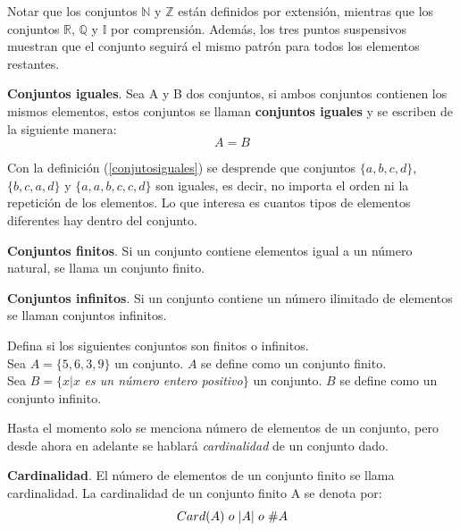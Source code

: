 Notar que los conjuntos $\mathbb{N}$ y $\mathbb{Z}$ están definidos por extensión, mientras que los conjuntos $\mathbb{R}$, $\mathbb{Q}$ y $\mathbb{I}$ por comprensión. Además, los tres puntos suspensivos muestran que el conjunto seguirá el mismo patrón para todos los elementos restantes.\\

\begin{mydef}
\textbf{Conjuntos iguales}. Sea A y B dos conjuntos, si ambos conjuntos contienen los mismos elementos, estos conjuntos se llaman \textbf{conjuntos iguales} y se escriben de la siguiente manera:
\begin{equation*}
A=B
\end{equation*}
\label{conjutosiguales}
\end{mydef}
Con la definición (\ref{conjutosiguales}) se desprende que conjuntos $\{a,b,c,d\}$, $\{b,c,a,d\}$ y $\{a,a,b,c,c,d\}$ son iguales, es decir, no importa el orden ni la repetición de los elementos. Lo que interesa es cuantos tipos de elementos diferentes hay dentro del conjunto.

\begin{mydef}
\textbf{Conjuntos finitos}. Si un conjunto contiene elementos igual a un número natural, se llama un conjunto finito.
\end{mydef}

\begin{mydef}
\textbf{Conjuntos infinitos}. Si un conjunto contiene un número ilimitado de elementos se llaman conjuntos infinitos.
\end{mydef}

\begin{myexample}
Defina si los siguientes conjuntos son finitos o infinitos.\\

\noindent Sea $A=\{5,6,3,9\}$ un conjunto. $A$ se define como un conjunto finito.\\

\noindent Sea $B=\{x|x$ \textit{es un número entero positivo}$\}$ un conjunto. $B$ se define como un conjunto infinito.
\end{myexample}


Hasta el momento solo se menciona número de elementos de un conjunto, pero desde ahora en adelante se hablará \textit{cardinalidad} de un conjunto dado.\\

\begin{mydef}\label{cardinalidad}
\textbf{Cardinalidad}. El número de elementos de un conjunto finito se llama cardinalidad. La cardinalidad de un conjunto finito A se denota por:\\
\begin{equation*}
Card(A) \hspace{3px} o \hspace{3px} |A| \hspace{3px} o \hspace{3px} \#A 
\end{equation*}
\end{mydef}

